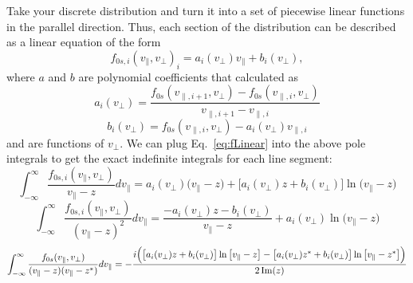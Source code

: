 Take your discrete distribution and turn it into a set of piecewise linear functions in the parallel direction.
Thus, each section of the distribution can be described as a linear equation of the form  %
\begin{equation}
	f_{0s,i}(v_\parallel, v_\perp)_i = a_i(v_\perp) v_\parallel + b_i(v_\perp),
	\label{eq:fLinear}
\end{equation}
where $a$ and $b$ are polynomial coefficients that calculated as
\begin{equation}
	a_i(v_\perp) = \frac{f_{0s}(v_{\parallel,i+1},v_\perp) - f_{0s}(v_{\parallel,i},v_\perp)}{v_{\parallel,i+1} - v_{\parallel,i}}
\end{equation}
\begin{equation}
	b_i(v_\perp) = f_{0s}(v_{\parallel,i},v_\perp)-a_i(v_\perp) v_{\parallel,i}
\end{equation}
and are functions of $v_\perp$.
We can plug Eq.~\ref{eq:fLinear} into the above pole integrals %
to get the exact indefinite integrals for each line segment:
\begin{equation}
	\int_{-\infty}^\infty \frac{f_{0s,i}(v_\parallel,v_\perp)}{v_\parallel - z} dv_\parallel = 
	a_i(v_\perp) \big(v_\parallel-z\big) + \big[ a_i(v_\perp) z + b_i(v_\perp) ] \ln \big( v_\parallel - z \big)
\end{equation}
\begin{equation}
	\int_{-\infty}^\infty \frac{f_{0s,i}(v_\parallel,v_\perp)}{(v_\parallel - z)^2} dv_\parallel = 
	\frac{-a_i(v_\perp)z - b_i(v_\perp)}{v_\parallel - z} + a_i(v_\perp) \ln\big(v_\parallel-z\big)
\end{equation}
\begin{equation}
	\int_{-\infty}^\infty \frac{f_{0s}(v_\parallel,v_\perp)}{(v_\parallel - z)(v_\parallel - z^*)} dv_\parallel = 
	- \frac{i \Big( \big[ a_i(v_\perp)z + b_i(v_\perp)\big] \ln \big[ v_\parallel-z \big] - 
		\big[ a_i(v_\perp)z^* + b_i(v_\perp)\big] \ln \big[ v_\parallel-z^* \big] 
		 \Big)  }{2 \operatorname{Im}(z)}
\end{equation}
